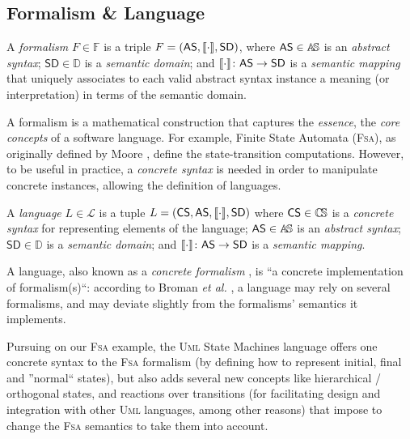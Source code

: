 \subsection{Formalism \& Language}
\label{sec:Formalism-Language}

\begin{Definition}[Formalism]
   A \emph{formalism} $F\in\mathbb{F}$ is a triple $F = (\mathsf{AS}, 
\llbracket \cdot \rrbracket, \mathsf{SD})$, where $\mathsf{AS}\in\mathbb{A}\!\mathbb{S}$ is an \emph{abstract 
syntax}; $\mathsf{SD}\in\mathbb{D}$ is a \emph{semantic domain}; and $\llbracket \cdot \rrbracket 
\colon \mathsf{AS} \to \mathsf{SD}$ is a \emph{semantic mapping} that uniquely 
associates to each valid abstract syntax instance a meaning (or interpretation) 
in terms of the semantic domain.
\end{Definition}
A formalism is a mathematical construction that captures the \emph{essence}, 
the \emph{core concepts} of a software language. For example, Finite State 
Automata (\textsc{Fsa}), as originally defined by Moore \cite{J:Moore:1956}, 
define the 
state-transition computations. However, to be useful in practice, a 
\emph{concrete syntax} is needed in order to manipulate concrete instances, 
allowing the definition of languages.

 \begin{Definition}[Language]
   A \emph{language} $L\in\mathcal{L}$ is a tuple $L = (\mathsf{CS}, 
\mathsf{AS}, \llbracket \cdot \rrbracket, \mathsf{SD})$ where $\mathsf{CS}\in\mathbb{C}\!\mathbb{S}$ is a 
\emph{concrete syntax} for representing elements of the language;  
$\mathsf{AS}\in\mathbb{A}\!\mathbb{S}$ is an \emph{abstract syntax}; $\mathsf{SD}\in\mathbb{D}$ is 
a \emph{semantic domain}; and $\llbracket \cdot \rrbracket \colon \mathsf{AS} \to \mathsf{SD}$ is 
a \emph{semantic mapping}. 
\end{Definition}
A language, also known as a \emph{concrete formalism} \cite{P:MPM:2006}, is ``a 
concrete implementation of formalism(s)``: according to Broman \emph{et al.} 
\cite{Broman-etAl:2012}, a language may rely on several formalisms, and may 
deviate slightly from the formalisms' semantics it implements. 

Pursuing on our \textsc{Fsa} example, the \textsc{Uml} State Machines language
\cite{} offers one concrete syntax to the \textsc{Fsa} formalism (by defining 
how to represent initial, final and ''normal`` states), but also adds several 
new concepts like hierarchical / orthogonal states, and reactions over 
transitions (for facilitating design and integration with other \textsc{Uml} 
languages, among other reasons) that impose to change the \textsc{Fsa} 
semantics to take them into account.


